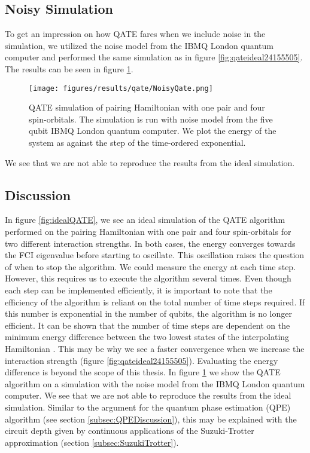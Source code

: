 \subsection{Noisy Simulation}
\label{subsec:ResQATENoisy}
To get an impression on how QATE fares when we include noise in the simulation, we utilized the noise model from the IBMQ London quantum computer and performed the same simulation as in figure \ref{fig:qateideal24155505}. The results can be seen in figure \ref{fig:NoisyQate}.
\begin{figure}[H]
    \centering
    \texttt{[image: figures/results/qate/NoisyQate.png]}
    \caption{QATE simulation of pairing Hamiltonian with one pair and four spin-orbitals. The simulation is run with noise model from the five qubit IBMQ London quantum computer. We plot the energy of the system as against the step of the time-ordered exponential.}
    \label{fig:NoisyQate}
\end{figure}
We see that we are not able to reproduce the results from the ideal simulation.

\subsection{Discussion}
\label{sec:DiscussionQATE}
In figure \ref{fig:idealQATE}, we see an ideal simulation of the QATE algorithm performed on the pairing Hamiltonian with one pair and four spin-orbitals for two different interaction strengths. In both cases, the energy converges towards the FCI eigenvalue before starting to oscillate. This oscillation raises the question of when to stop the algorithm. We could measure the energy at each time step. However, this requires us to execute the algorithm several times. Even though each step can be implemented efficiently, it is important to note that the efficiency of the algorithm is reliant on the total number of time steps required. If this number is exponential in the number of qubits, the algorithm is no longer efficient. It can be shown that the number of time steps are dependent on the minimum energy difference between the two lowest states of the interpolating Hamiltonian \cite{AdiabaticTimeEvolution}. This may be why we see a faster convergence when we increase the interaction strength (figure \ref{fig:qateideal24155505}). Evaluating the energy difference is beyond the scope of this thesis.\newline
In figure \ref{fig:NoisyQate} we show the QATE algorithm on a simulation with the noise model from the IBMQ London quantum computer. We see that we are not able to reproduce the results from the ideal simulation. Similar to the argument for the quantum phase estimation (QPE) algorithm (see section \ref{subsec:QPEDiscussion}), this may be explained with the circuit depth given by continuous applications of the Suzuki-Trotter approximation (section \ref{subsec:SuzukiTrotter}).


